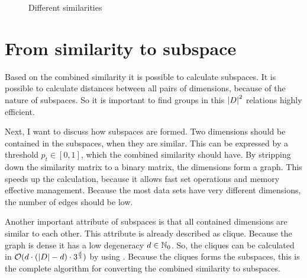 \begin{figure}
	\centering
	
	\caption{Different similarities}
	\label{fig:similarities}
\end{figure}

\section{From similarity to subspace}
Based on the combined similarity it is possible to calculate subspaces. It is possible to calculate distances between all pairs of dimensions, because of the nature of subspaces. So it is important to find groups in this $\left|D\right|^2$ relations highly efficient.

Next, I want to discuss how subspaces are formed. Two dimensions should be contained in the subspaces, when they are similar. This can be expressed by a threshold $p_t \in [0,1]$, which the combined similarity should have. By stripping down the similarity matrix to a binary matrix, the dimensions form a graph. This speeds up the calculation, because it allows fast set operations and memory effective management. Because the most data sets have very different dimensions, the number of edges should be low.

Another important attribute of subspaces is that all contained dimensions are similar to each other. This attribute is already described as clique. Because the graph is dense it has a low degeneracy $d \in \mathbb{N}_0$. So, the cliques can be calculated in $\mathcal{O}(d \cdot (\left|D\right| - d) \cdot 3^{\frac{d}{3}})$ by using \cite{listingCliques}. Because the cliques forms the subspaces, this is the complete algorithm for converting the combined similarity to subspaces.


